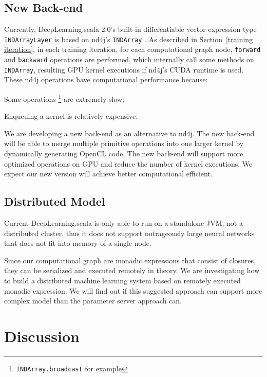 \subsection{New Back-end}
Currently, DeepLearning.scala 2.0's built-in differentiable vector expression type \lstinline{INDArrayLayer} is based on nd4j's \lstinline{INDArray}  \cite{skymind2017nd4j}.
As described in Section~\ref{training iteration}, in each training iteration, for each \gls{computational graph} node, \lstinline{forward} and \lstinline{backward} operations are performed, which internally call some methods on \lstinline{INDArray}, resulting GPU kernel executions if nd4j's CUDA runtime is used. These nd4j operations have computational performance because:
\begin{enumerate*}
  \item Some operations \footnote{\lstinline{INDArray.broadcast} for example} are extremely slow;
  \item Enqueuing a kernel is relatively expensive.
\end{enumerate*}

 We are developing a new back-end as an alternative to nd4j. The new back-end will be able to merge multiple primitive operations into one larger kernel by dynamically generating OpenCL code. The new back-end
 will support more optimized operations on GPU and reduce the number of kernel executions. We expect our new version will achieve better computational efficient.

\subsection{Distributed Model}

Current DeepLearning.scala is only able to run on a standalone JVM, not a distributed cluster, thus it does not support outrageously large neural networks \cite{shazeer2017outrageously} that does not fit into memory of a single node.

Since our \gls{computational graph} are monadic expressions that consist of closures, they can be serialized and executed remotely in theory. We are investigating how to build a distributed machine learning system based on remotely executed monadic expression. We will find out if this suggested approach can support more complex model than the parameter server approach can.




\section{Discussion}

